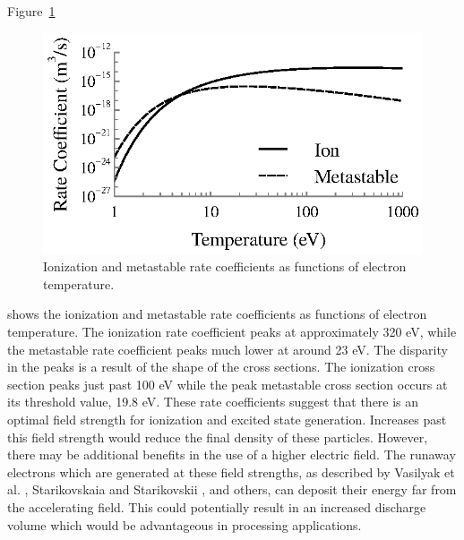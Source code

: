 Figure~\ref{fig:longrates}
\begin{figure}
  \centering
  \includegraphics{./chapters/modeling/figures/longrates.eps}
  \caption{Ionization and metastable rate coefficients as functions of
    electron temperature.}
  \label{fig:longrates}
\end{figure}
shows the ionization and metastable rate coefficients as functions of electron
temperature. The ionization rate coefficient peaks at approximately 320 eV,
while the metastable rate coefficient peaks much lower at around 23 eV. The
disparity in the peaks is a result of the shape of the cross sections. The
ionization cross section peaks just past 100 eV while the peak metastable cross
section occurs at its threshold value, 19.8 eV. These rate coefficients suggest
that there is an optimal field strength for ionization and excited state
generation. Increases past this field strength would reduce the final density of
these particles. However, there may be additional benefits in the use of a
higher electric field. The runaway electrons which are generated at these field
strengths, as described by Vasilyak et al. \cite{Vasilyak1994}, Starikovskaia
and Starikovskii \cite{Starikovskaia2001a}, and others, can deposit their energy
far from the accelerating field. This could potentially result in an increased
discharge volume which would be advantageous in processing applications.

